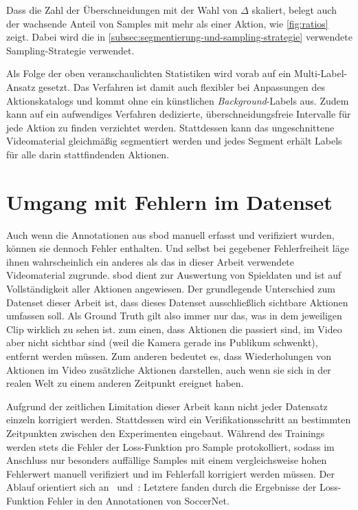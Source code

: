 Dass die Zahl der Überschneidungen mit der Wahl von $\Delta$ skaliert, belegt auch der wachsende Anteil von Samples mit mehr als einer Aktion, wie \autoref{fig:ratios} zeigt.
Dabei wird die in \autoref{subsec:segmentierung-und-sampling-strategie} verwendete Sampling-Strategie verwendet.

Als Folge der oben veranschaulichten Statistiken wird vorab auf ein Multi-Label-Ansatz gesetzt.
Das Verfahren ist damit auch flexibler bei Anpassungen des Aktionskatalogs und kommt ohne ein künstlichen \emph{Background}-Labels aus.
Zudem kann auf ein aufwendiges Verfahren dedizierte, überschneidungsfreie Intervalle für jede Aktion zu finden verzichtet werden.
Stattdessen kann das ungeschnittene Videomaterial gleichmäßig segmentiert werden und jedes Segment erhält Labels für alle darin stattfindenden Aktionen.

\section{Umgang mit Fehlern im Datenset}
\label{sec:umgang-mit-fehlern-in-datenset}

Auch wenn die Annotationen aus \gls{sbod} manuell erfasst und verifiziert wurden, können sie dennoch Fehler enthalten.
Und selbst bei gegebener Fehlerfreiheit läge ihnen wahrscheinlich ein anderes als das in dieser Arbeit verwendete Videomaterial zugrunde.
\gls{sbod} dient zur Auswertung von Spieldaten und ist auf Vollständigkeit aller Aktionen angewiesen.
Der grundlegende Unterschied zum Datenset dieser Arbeit ist, dass dieses Datenset ausschließlich sichtbare Aktionen umfassen soll.
Als Ground Truth gilt also immer nur das, was in dem jeweiligen Clip wirklich zu sehen ist.
\Dh zum einen, dass Aktionen die passiert sind, im Video aber nicht sichtbar sind (\zB weil die Kamera gerade ins Publikum schwenkt), entfernt werden müssen.
Zum anderen bedeutet es, dass Wiederholungen von Aktionen im Video zusätzliche Aktionen darstellen, auch wenn sie sich in der realen Welt zu einem anderen Zeitpunkt ereignet haben.

Aufgrund der zeitlichen Limitation dieser Arbeit kann nicht jeder Datensatz einzeln korrigiert werden.
Stattdessen wird ein Verifikationsschritt an bestimmten Zeitpunkten zwischen den Experimenten eingebaut.
Während des Trainings werden stets die Fehler der Loss-Funktion pro Sample protokolliert, sodass im Anschluss nur besonders auffällige Samples mit einem vergleichsweise hohen Fehlerwert manuell verifiziert und im Fehlerfall korrigiert werden müssen.
Der Ablauf orientiert sich an~\cite{Gugger20} und~\cite{Cioppa20}:
Letztere fanden durch die Ergebnisse der Loss-Funktion Fehler in den Annotationen von SoccerNet.


